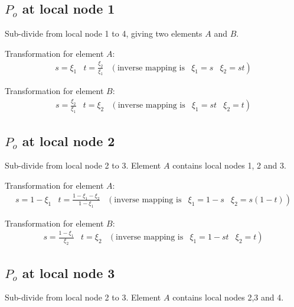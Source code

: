 \subsection{$P_{o}$ at local node 1}

Sub-divide from local node 1 to 4, giving two elements $A$ and $B$.

Transformation for element $A$:
\begin{displaymath}
\begin{array}{llllr}        
  s = \xi_{1} & t = \frac{\xi_{2}}{\xi_{1}} & \left(\mbox{inverse mapping
      is}\right. & \xi_{1} = s & \left.\xi_{2} = s t \right)
\end{array}
\end{displaymath}

Transformation for element $B$:
\begin{displaymath}
\begin{array}{llllr}        
 s = \frac{\xi_{2}}{\xi_{1}} & t = \xi_{2} & 
  \left(\mbox{inverse mapping is}\right. & \xi_{1} = st & 
  \left.\xi_{2} = t \right)
\end{array}
\end{displaymath} 
 
\subsection{$P_{o}$ at local node 2}
Sub-divide from local node 2 to 3.  Element $A$ contains local nodes 1, 2 and
3.

Transformation for element $A$:
\begin{displaymath}
\begin{array}{llllr}        
 s = 1-\xi_{1} & t = \frac{1-\xi_{1}-\xi_{2}}{1-\xi_{1}} & 
  \left(\mbox{inverse mapping is}\right. & \xi_{1} = 1-s & 
  \left.\xi_{2} = s (1-t) \right)
\end{array}
\end{displaymath}

Transformation for element $B$:
\begin{displaymath}
\begin{array}{llllr}        
 s = \frac{1-\xi_{1}}{\xi_{2}} & t = \xi_{2} & 
  \left(\mbox{inverse mapping is}\right. & \xi_{1} = 1-st & 
  \left.\xi_{2} = t \right)
\end{array}
\end{displaymath}  

\subsection{$P_{o}$ at local node 3}
Sub-divide from local node 2 to 3.  Element $A$ contains local nodes 2,3 and 4.

